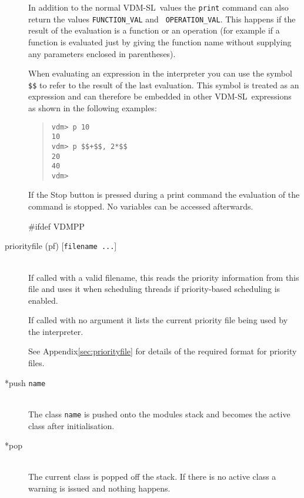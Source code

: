 \documentclass[\pformat,12pt]{article}
\newcommand{\vdmslpp}{VDM-SL}
\newcommand{\vdmslpp}{VDM++}
\newcommand{\guicmd}[1]{{\sf #1}}
\newcommand{\guicmd}[1]{{\gt #1}}
\begin{document}
\begin{description}
  In addition to the normal \vdmslpp\ values the {\tt print} command
  can also return the values {\tt FUNCTION\_VAL} and {\tt
    OPERATION\_VAL}\@.  This happens if the result of the evaluation is
  a function or an operation (for example if a function
  is evaluated just by giving the function name without supplying any
  parameters enclosed in parentheses).
  
  When evaluating an expression in the interpreter you can use the 
  symbol {\tt \$\$}\index{\$\$} to refer to the result of the last
  evaluation. This symbol is treated as an expression and can
  therefore be embedded in other \vdmslpp\ expressions as shown in
  the following examples:

\begin{quote}
\begin{verbatim}
vdm> p 10
10
vdm> p $$+$$, 2*$$
20
40
vdm> 
\end{verbatim}
\end{quote}

  If the \guicmd{Stop} button
  is pressed during a 
  print command the evaluation of the command is stopped. No variables
  can be accessed afterwards.
  
#ifdef VDMPP
\item[priorityfile (pf) \mbox{[{\tt filename ...}]}]
  \mbox{}\\
  If called with a valid filename, this reads the priority information
  from this file and uses it when scheduling threads if
  priority-based scheduling is enabled.

  If called with no argument it lists the current priority file being
  used by the interpreter.

  See Appendix\ref{sec:priorityfile} for details of the required
  format for priority files.

\item[*push {\tt name}] \mbox{}\\
  The class {\tt name}\/ is pushed onto the modules stack and becomes
  the active class after initialisation.
  
\item[*pop] \mbox{}\\
  The current class is popped off the stack. 
If there is no active class a warning is issued and
  nothing happens.


\end{description}
\end{document}
